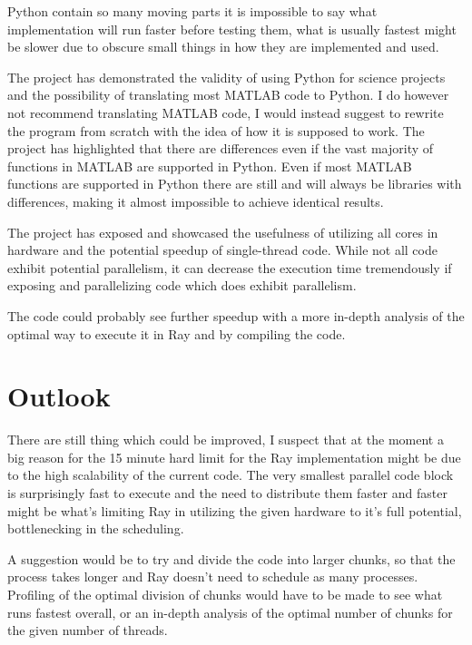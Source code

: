 \documentclass[12pt, a4paper]{article}
\begin{document}
Python contain so many moving parts it is impossible to say what implementation will run faster before testing them, what is usually fastest might be slower due to obscure small things in how they are implemented and used.

The project has demonstrated the validity of using Python for science projects and the possibility of translating most MATLAB code to Python.
I do however not recommend translating MATLAB code, I would instead suggest to rewrite the program from scratch with the idea of how it is supposed to work.
The project has highlighted that there are differences even if the vast majority of functions in MATLAB are supported in Python.
Even if most MATLAB functions are supported in Python there are still and will always be libraries with differences, making it almost impossible to achieve identical results.

The project has exposed and showcased the usefulness of utilizing all cores in hardware and the potential speedup of single-thread code.
While not all code exhibit potential parallelism, it can decrease the execution time tremendously if exposing and parallelizing code which does exhibit parallelism.

The code could probably see further speedup with a more in-depth analysis of the optimal way to execute it in Ray and by compiling the code.


\section{Outlook}

There are still thing which could be improved, I suspect that at the moment a big reason for the 15 minute hard limit for the Ray implementation might be due to the high scalability of the current code.
The very smallest parallel code block is surprisingly fast to execute and the need to distribute them faster and faster might be what's limiting Ray in utilizing the given hardware to it's full potential, bottlenecking in the scheduling.

A suggestion would be to try and divide the code into larger chunks, so that the process takes longer and Ray doesn't need to schedule as many processes.
Profiling of the optimal division of chunks would have to be made to see what runs fastest overall, or an in-depth analysis of the optimal number of chunks for the given number of threads.
\end{document}
